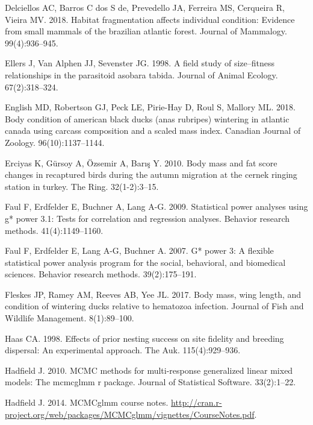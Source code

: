 \documentclass[
]{article}
\begin{document}
\leavevmode\hypertarget{ref-delciellos2018habitat}{}%
Delciellos AC, Barros C dos S de, Prevedello JA, Ferreira MS, Cerqueira
R, Vieira MV. 2018. Habitat fragmentation affects individual condition:
Evidence from small mammals of the brazilian atlantic forest. Journal of
Mammalogy. 99(4):936--945.

\leavevmode\hypertarget{ref-ellers1998field}{}%
Ellers J, Van Alphen JJ, Sevenster JG. 1998. A field study of
size--fitness relationships in the parasitoid asobara tabida. Journal of
Animal Ecology. 67(2):318--324.

\leavevmode\hypertarget{ref-english2018body}{}%
English MD, Robertson GJ, Peck LE, Pirie-Hay D, Roul S, Mallory ML.
2018. Body condition of american black ducks (anas rubripes) wintering
in atlantic canada using carcass composition and a scaled mass index.
Canadian Journal of Zoology. 96(10):1137--1144.

\leavevmode\hypertarget{ref-erciyas2010body}{}%
Erciyas K, Gürsoy A, Özsemir A, Barış Y. 2010. Body mass and fat score
changes in recaptured birds during the autumn migration at the cernek
ringing station in turkey. The Ring. 32(1-2):3--15.

\leavevmode\hypertarget{ref-faul2009statistical}{}%
Faul F, Erdfelder E, Buchner A, Lang A-G. 2009. Statistical power
analyses using g* power 3.1: Tests for correlation and regression
analyses. Behavior research methods. 41(4):1149--1160.

\leavevmode\hypertarget{ref-faul2007g}{}%
Faul F, Erdfelder E, Lang A-G, Buchner A. 2007. G* power 3: A flexible
statistical power analysis program for the social, behavioral, and
biomedical sciences. Behavior research methods. 39(2):175--191.

\leavevmode\hypertarget{ref-fleskes2017body}{}%
Fleskes JP, Ramey AM, Reeves AB, Yee JL. 2017. Body mass, wing length,
and condition of wintering ducks relative to hematozoa infection.
Journal of Fish and Wildlife Management. 8(1):89--100.

\leavevmode\hypertarget{ref-haas1998effects}{}%
Haas CA. 1998. Effects of prior nesting success on site fidelity and
breeding dispersal: An experimental approach. The Auk. 115(4):929--936.

\leavevmode\hypertarget{ref-hadfield2010mcmc}{}%
Hadfield J. 2010. MCMC methods for multi-response generalized linear
mixed models: The mcmcglmm r package. Journal of Statistical Software.
33(2):1--22.

\leavevmode\hypertarget{ref-hadfield2014coursenotes}{}%
Hadfield J. 2014. MCMCglmm course notes.
\url{http://cran.r-project.org/web/packages/MCMCglmm/vignettes/CourseNotes.pdf}.
\end{document}
